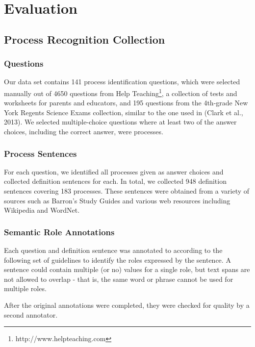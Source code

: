 \section{Evaluation}

\subsection{Process Recognition Collection}

\subsubsection{Questions}

Our data set contains 141 process identification questions, which were selected manually out of 4650 questions from Help Teaching\footnote{http://www.helpteaching.com}, a collection of tests and worksheets for parents and educators, and 195 questions from the 4th-grade New York Regents Science Exams collection, similar to the one used in (Clark et al., 2013). We selected multiple-choice questions where at least two of the answer choices, including the correct answer, were processes.

\subsubsection{Process Sentences}

For each question, we identified all processes given as answer choices and collected definition sentences for each. In total, we collected 948 definition sentences covering 183 processes. These sentences were obtained from a variety of sources such as Barron's Study Guides and various web resources including Wikipedia and WordNet.  

\subsubsection{Semantic Role Annotations}

Each question and definition sentence was annotated to according to the following set of guidelines to identify the roles expressed by the sentence. A sentence could contain multiple (or no) values for a single role, but text spans are not allowed to overlap - that is, the same word or phrase cannot be used for multiple roles.

After the original annotations were completed, they were checked for quality by a second annotator.

